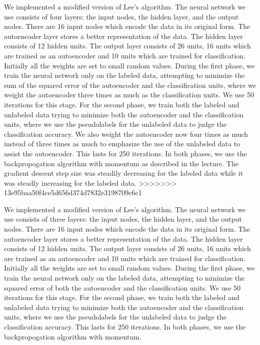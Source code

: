 \documentclass[11pt]{article}
\begin{document}
We implemented a modified version of Lee's algorithm. The neural network we use consists of four layers: the input nodes, the hidden layer, and the output nodes. There are 16 input nodes which encode the data in its original form. The autoencoder layer stores a better representation of the data. The hidden layer consists of 12 hidden units. The output layer consists of 26 units, 16 units which are trained as an autoencoder and 10 units which are trained for classification. Initially all the weights are set to small random values. During the first phase, we train the neural network only on the labeled data, attempting to minimize the sum of the squared error of the autoencoder and the classification units, where we weight the autoencoder three times as much as the classification units. We use 50 iterations for this stage. For the second phase, we train both the labeled and unlabeled data trying to minimize both the autoencoder and the classification units, where we use the pseudolabels for the unlabeled data to judge the classification accuracy. We also weight the autoencoder now four times as much instead of three times as much to emphasize the use of the unlabeled data to assist the autoencoder. This lasts for 250 iterations. In both phases, we use the backpropogation algorithm with momentum as described in the lecture. The gradient descent step size was steadily decreasing for the labeled data while it was steadly increasing for the labeled data.
>>>>>>> 13e95baa50f4ce5d656d374d7832e3198709c6c1

We implemented a modified version of Lee's algorithm. The neural network we use consists of three layers: the input nodes, the hidden layer, and the output nodes. There are 16 input nodes which encode the data in its original form. The autoencoder layer stores a better representation of the data. The hidden layer consists of 12 hidden units. The output layer consists of 26 units, 16 units which are trained as an autoencoder and 10 units which are trained for classification. Initially all the weights are set to small random values. During the first phase, we train the neural network only on the labeled data, attempting to minimize the squared error of both the autoencoder and the classification units. We use 50 iterations for this stage. For the second phase, we train both the labeled and unlabeled data trying to minimize both the autoencoder and the classification units, where we use the pseudolabels for the unlabeled data to judge the classification accuracy. This lasts for 250 iterations. In both phases, we use the backpropogation algorithm with momentum.
\end{document}
